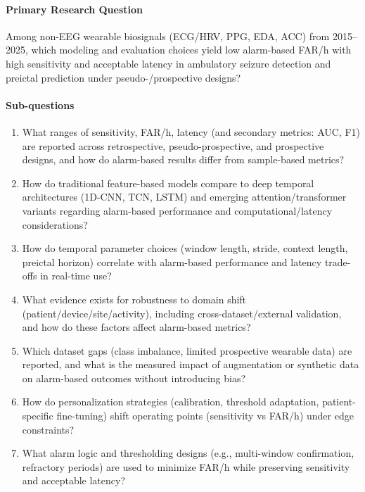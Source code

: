 \paragraph{Primary Research Question}
Among non-EEG wearable biosignals (ECG/HRV, PPG, EDA, ACC) from
2015--2025, which modeling and evaluation choices yield low alarm-based
FAR/h with high sensitivity and acceptable latency in ambulatory
seizure detection and preictal prediction under pseudo-/prospective
designs?

\paragraph{Sub-questions}
\begin{enumerate}
  \item What ranges of sensitivity, FAR/h, latency (and secondary
    metrics: AUC, F1) are reported across retrospective,
    pseudo-prospective, and prospective designs, and how do alarm-based
    results differ from sample-based metrics?
  \item How do traditional feature-based models compare to deep
    temporal architectures (1D-CNN, TCN, LSTM) and emerging
    attention/transformer variants regarding alarm-based performance and
    computational/latency considerations?
  \item How do temporal parameter choices (window length, stride,
    context length, preictal horizon) correlate with alarm-based
    performance and latency trade-offs in real-time use?
  \item What evidence exists for robustness to domain shift
    (patient/device/site/activity), including cross-dataset/external
    validation, and how do these factors affect alarm-based metrics?
  \item Which dataset gaps (class imbalance, limited prospective
    wearable data) are reported, and what is the measured impact of
    augmentation or synthetic data on alarm-based outcomes without
    introducing bias?
  \item How do personalization strategies (calibration, threshold
    adaptation, patient-specific fine-tuning) shift operating points
    (sensitivity vs FAR/h) under edge constraints?
  \item What alarm logic and thresholding designs (e.g., multi-window
    confirmation, refractory periods) are used to minimize FAR/h while
    preserving sensitivity and acceptable latency?
\end{enumerate}

